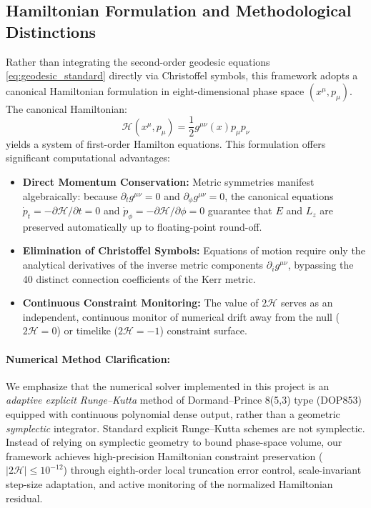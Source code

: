 \subsection{Hamiltonian Formulation and Methodological Distinctions}
Rather than integrating the second-order geodesic equations \eqref{eq:geodesic_standard} directly via Christoffel symbols, this framework adopts a canonical Hamiltonian formulation in eight-dimensional phase space $(x^\mu, p_\mu)$. The canonical Hamiltonian:
\begin{equation}
    \mathcal{H}(x^\mu, p_\mu) = \frac{1}{2} g^{\mu\nu}(x) p_\mu p_\nu
    \label{eq:hamiltonian_intro}
\end{equation}
yields a system of first-order Hamilton equations. This formulation offers significant computational advantages:
\begin{itemize}
    \item \textbf{Direct Momentum Conservation:} Metric symmetries manifest algebraically: because $\partial_t g^{\mu\nu} = 0$ and $\partial_\phi g^{\mu\nu} = 0$, the canonical equations $\dot{p}_t = -\partial\mathcal{H}/\partial t = 0$ and $\dot{p}_\phi = -\partial\mathcal{H}/\partial\phi = 0$ guarantee that $E$ and $L_z$ are preserved automatically up to floating-point round-off.
    \item \textbf{Elimination of Christoffel Symbols:} Equations of motion require only the analytical derivatives of the inverse metric components $\partial_i g^{\mu\nu}$, bypassing the 40 distinct connection coefficients of the Kerr metric.
    \item \textbf{Continuous Constraint Monitoring:} The value of $2\mathcal{H}$ serves as an independent, continuous monitor of numerical drift away from the null ($2\mathcal{H} = 0$) or timelike ($2\mathcal{H} = -1$) constraint surface.
\end{itemize}

\paragraph{Numerical Method Clarification:} We emphasize that the numerical solver implemented in this project is an \textit{adaptive explicit Runge--Kutta} method of Dormand--Prince 8(5,3) type (DOP853) equipped with continuous polynomial dense output, rather than a geometric \textit{symplectic} integrator. Standard explicit Runge--Kutta schemes are not symplectic. Instead of relying on symplectic geometry to bound phase-space volume, our framework achieves high-precision Hamiltonian constraint preservation ($|2\mathcal{H}| \le 10^{-12}$) through eighth-order local truncation error control, scale-invariant step-size adaptation, and active monitoring of the normalized Hamiltonian residual.

